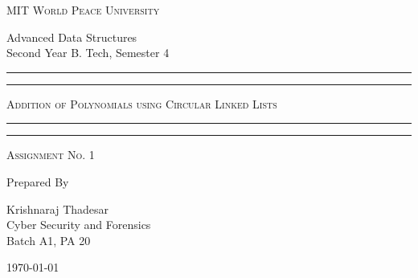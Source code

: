 \documentclass[11pt]{article}
\begin{document}
\begin{titlepage}
	\centering


	\huge\textsc{
		MIT World Peace University
	}\\

	\vspace{0.75\baselineskip} %

	\LARGE{
		Advanced Data Structures\\
		Second Year B. Tech, Semester 4
	}

	\vfill %


	\rule{\textwidth}{1.6pt}\vspace*{-\baselineskip}\vspace*{2pt}
	\rule{\textwidth}{0.6pt}
	\vspace{0.75\baselineskip} %



	\huge{\textsc{
			Addition of Polynomials using Circular Linked Lists
		}} \\



	\vspace{0.5\baselineskip} %
	\rule{\textwidth}{0.6pt}\vspace*{-\baselineskip}\vspace*{2.8pt}
	\rule{\textwidth}{1.6pt}

	\vspace{1\baselineskip} %


	\LARGE\textsc{
		Assignment No. 1
	} %
	\vfill


	Prepared By
	\vspace{0.5\baselineskip} %

	\Large{
		Krishnaraj Thadesar \\
		Cyber Security and Forensics\\
		Batch A1, PA 20
	}


	\vspace{0.5\baselineskip} %
	\today

\end{titlepage}
\end{document}
